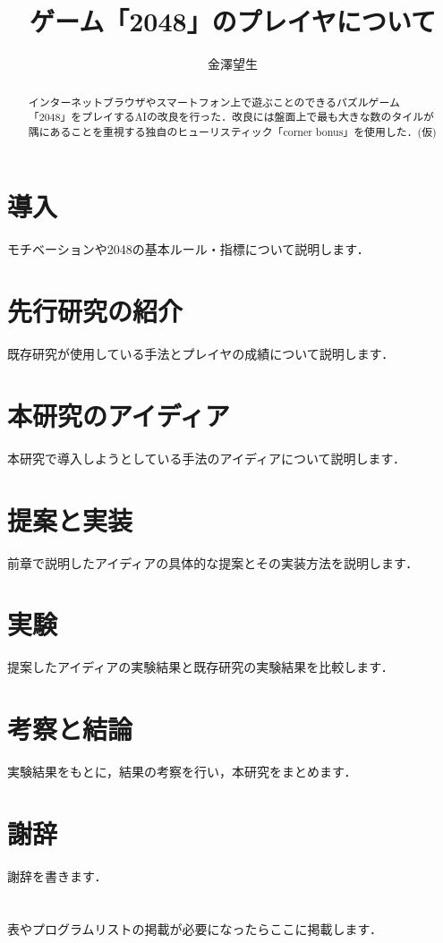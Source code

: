 \documentclass{suribt}
\title{ゲーム「2048」のプレイヤについて}
\author{金澤望生}
\begin{document}
\maketitle

\frontmatter
\begin{abstract}
インターネットブラウザやスマートフォン上で遊ぶことのできるパズルゲーム「2048」をプレイするAIの改良を行った．改良には盤面上で最も大きな数のタイルが隅にあることを重視する独自のヒューリスティック「corner bonus」を使用した．(仮)
\end{abstract}

\tableofcontents

\mainmatter
\chapter{導入}
モチベーションや2048の基本ルール・指標について説明します．

\chapter{先行研究の紹介}
既存研究が使用している手法とプレイヤの成績について説明します．

\chapter{本研究のアイディア}
本研究で導入しようとしている手法のアイディアについて説明します．

\chapter{提案と実装}
前章で説明したアイディアの具体的な提案とその実装方法を説明します．

\chapter{実験}
提案したアイディアの実験結果と既存研究の実験結果を比較します．

\chapter{考察と結論}
実験結果をもとに，結果の考察を行い，本研究をまとめます．

\backmatter
\chapter{謝辞}
謝辞を書きます．

\begin{thebibliography}{}
 \bibitem{}
 \bibitem{}
\end{thebibliography}

\appendix
\chapter{}
表やプログラムリストの掲載が必要になったらここに掲載します．
\end{document}
